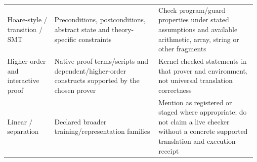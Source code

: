 \begin{longtable}{@{}>{\raggedright\arraybackslash}p{.24\linewidth} >{\raggedright\arraybackslash}p{.32\linewidth} >{\raggedright\arraybackslash}p{.38\linewidth}@{}}
Hoare-style / transition / SMT & Preconditions, postconditions, abstract state and theory-specific constraints & Check program/guard properties under stated assumptions and available arithmetic, array, string or other fragments \\[3pt]
Higher-order and interactive proof & Native proof terms/scripts and dependent/higher-order constructs supported by the chosen prover & Kernel-checked statements in that prover and environment, not universal translation correctness \\[3pt]
Linear / separation & Declared broader training/representation families & Mention as registered or staged where appropriate; do not claim a live checker without a concrete supported translation and execution receipt \\[3pt]
\end{longtable}
\endgroup
